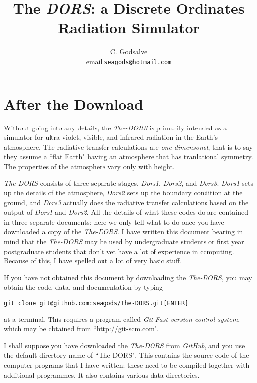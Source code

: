 \documentclass[12pt]{article}
\begin{document}


\thispagestyle{empty}

\title{ The {\it DORS}: a Discrete Ordinates Radiation Simulator}

\author{C. Godsalve \\
email:{\tt seagods@hotmail.com} }

\maketitle

\section{After the Download}


Without going into any details, the {\it The-DORS} is primarily intended as a simulator
for ultra-violet, visible, and infrared radiation in the Earth's atmosphere. 
The radiative transfer calculations are {\it one dimensonal}, that is to say they assume a ``flat Earth" having
an atmosphere that has tranlational symmetry. The properties of the atmosphere vary only with height.

{\it The-DORS} consists 
of three separate stages, {\it Dors1}, {\it Dors2}, and {\it Dors3}. {\it Dors1} sets up the
details of the atmosphere, {\it Dors2} sets up the boundary condition at the ground, and
{\it Dors3} actually does the radiative transfer calculations based on the output of {\it Dors1} and {\it Dors2}.
All the details of what these codes do are contained in three separate documents: here we only 
tell what to do once you have downloaded a copy of the {\it The-DORS}. I have written this document
 bearing in mind that the {\it The-DORS} may be used by undergraduate students or first
year postgraduate students that don't yet have a lot of experience in computing. Because of this, I have 
spelled out a lot of very basic stuff.

If you have not obtained this document by downloading the {\it The-DORS}, you may obtain the code, data, and documentation
by typing
\begin{verbatim}
git clone git@github.com:seagods/The-DORS.git[ENTER]
\end{verbatim} 
at a terminal. This requires a program called 
{\it Git-Fast version control system},
 which may be obtained from ``http://git-scm.com".

I shall suppose you have downloaded the {\it The-DORS} from {\it GitHub}, and you use the default directory name
of ``The-DORS". This contains the source code of the computer programs that
I have written: these need to be compiled together with additional programmes.
It also contains various data directories.
\end{document}
